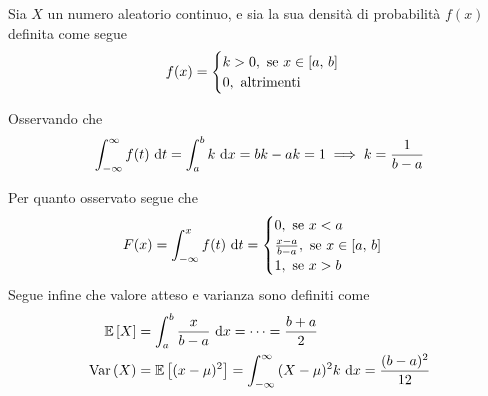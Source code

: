 \documentclass{subfiles}
\begin{document}
Sia \(X\) un numero aleatorio continuo, e sia la sua densità di probabilità \(f(x)\) definita come segue
\[
    f(x) = \begin{cases}
        k > 0, \text{se} x \in \Range*{a}{b} \\
        0, \text{altrimenti}
    \end{cases}\]
\begin{Remark*}
    Osservando che
    \[
        \Int{f(t)}{t}[-\infty][\infty] = \Int{k}{x}[a][b] = bk - ak = 1  \implies k = \Frac{1}{b - a}
    \]
\end{Remark*}
Per quanto osservato segue che
\[
    F(x) = \Int{f(t)}{t}[-\infty][x] = \begin{cases}
        0, \text{se} x < a                                 \\
        \Frac{x - a}{b - a}, \text{se} x \in \Range*{a}{b} \\
        1, \text{se} x > b
    \end{cases}\]
Segue infine che valore atteso e varianza sono definiti come
\[\begin{aligned}
        \Expected*{X} & = \Int{\Frac{x}{b - a}}{x}[a][b] = \cdots = \Frac{b + a}{2}                                      \\
        \Var{X}       & = \Expected*{(x - \mu)^{2}} = \Int{(X - \mu)^{2} k}{x}[-\infty][\infty] = \Frac{(b - a)^{2}}{12}
    \end{aligned}\]
\end{document}
